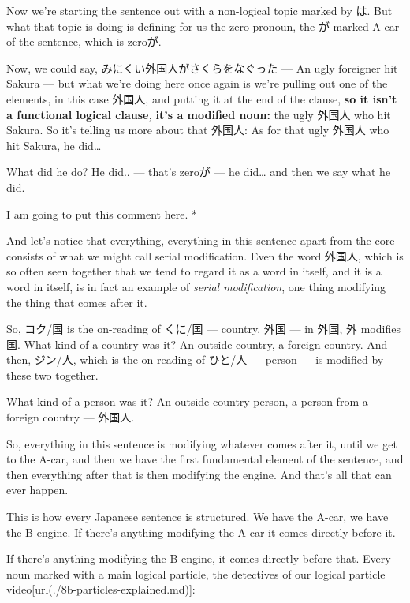 {}

Now we're starting the sentence out with a non-logical topic marked by は. But what that topic is doing is defining for us the zero pronoun, the が-marked A-car of the sentence, which is zeroが.

Now, we could say, みにくい外国人がさくらをなぐった --- An ugly foreigner hit Sakura --- but what we're doing here once again is we're pulling out one of the elements, in this case 外国人, and putting it at the end of the clause, {\bf so it isn't a functional logical clause}{\em ,} {\bf it's a modified noun:} the ugly 外国人 who hit Sakura. So it's telling us more about that 外国人: As for that ugly 外国人 who hit Sakura, he did\ldots{}

What did he do? He did.. --- that's zeroが --- he did\ldots{} and then we say what he did.

I am going to put this comment here. *{}

And let's notice that everything, everything in this sentence apart from the core consists of what we might call serial modification. Even the word 外国人, which is so often seen together that we tend to regard it as a word in itself, and it is a word in itself, is in fact an example of {\em serial modification}, one thing modifying the thing that comes after it.

{}

So, コク/国 is the on-reading of くに/国 --- country. 外国 --- in 外国, 外 modifies 国. What kind of a country was it? An outside country, a foreign country. And then, ジン/人, which is the on-reading of ひと/人 --- person --- is modified by these two together.

What kind of a person was it? An outside-country person, a person from a foreign country --- 外国人.

\thinrule

So, everything in this sentence is modifying whatever comes after it, until we get to the A-car, and then we have the first fundamental element of the sentence, and then everything after that is then modifying the engine. And that's all that can ever happen.

This is how every Japanese sentence is structured. We have the A-car, we have the B-engine. If there's anything modifying the A-car it comes directly before it.

If there's anything modifying the B-engine, it comes directly before that. Every noun marked with a main logical particle, the detectives of our logical particle video\goto{{[}8b{]}}[url(./8b-particles-explained.md)]:


